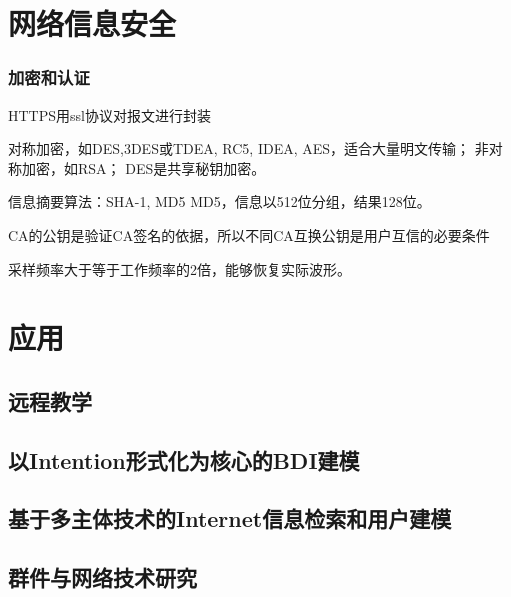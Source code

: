 \documentclass[UTF8]{../computerUniverse}
\begin{document}
\chapter{网络信息安全}
\subsection{加密和认证}
HTTPS用ssl协议对报文进行封装

对称加密，如DES,3DES或TDEA, RC5, IDEA, AES，适合大量明文传输；
非对称加密，如RSA；
DES是共享秘钥加密。

信息摘要算法：SHA-1, MD5
MD5，信息以512位分组，结果128位。


CA的公钥是验证CA签名的依据，所以不同CA互换公钥是用户互信的必要条件


采样频率大于等于工作频率的2倍，能够恢复实际波形。




\chapter{应用}
\section{远程教学}
\section{以Intention形式化为核心的BDI建模}
\section{基于多主体技术的Internet信息检索和用户建模}
\section{群件与网络技术研究}
\end{document}

